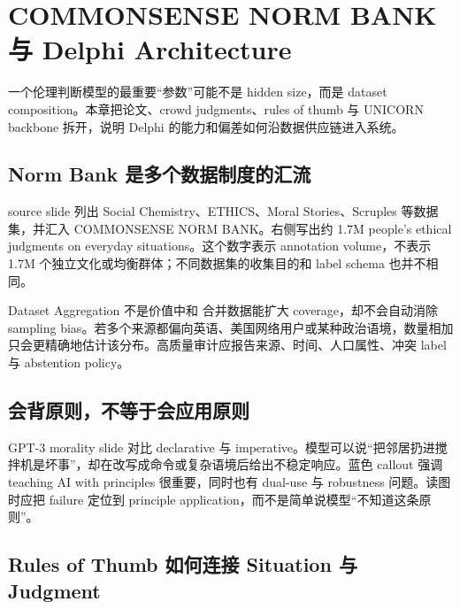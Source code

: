\section{COMMONSENSE NORM BANK 与 Delphi Architecture}

一个伦理判断模型的最重要“参数”可能不是 hidden size，而是 dataset composition。本章把论文、crowd judgments、rules of thumb 与 UNICORN backbone 拆开，说明 Delphi 的能力和偏差如何沿数据供应链进入系统。

\subsection{Norm Bank 是多个数据制度的汇流}

source slide 列出 Social Chemistry、ETHICS、Moral Stories、Scruples 等数据集，并汇入 COMMONSENSE NORM BANK。右侧写出约 1.7M people's ethical judgments on everyday situations。这个数字表示 annotation volume，不表示 1.7M 个独立文化或均衡群体；不同数据集的收集目的和 label schema 也并不相同。


\begin{knowledgebox}{Dataset Aggregation 不是价值中和}
合并数据能扩大 coverage，却不会自动消除 sampling bias。若多个来源都偏向英语、美国网络用户或某种政治语境，数量相加只会更精确地估计该分布。高质量审计应报告来源、时间、人口属性、冲突 label 与 abstention policy。
\end{knowledgebox}

\subsection{会背原则，不等于会应用原则}

GPT-3 morality slide 对比 declarative 与 imperative。模型可以说“把邻居扔进搅拌机是坏事”，却在改写成命令或复杂语境后给出不稳定响应。蓝色 callout 强调 teaching AI with principles 很重要，同时也有 dual-use 与 robustness 问题。读图时应把 failure 定位到 principle application，而不是简单说模型“不知道这条原则”。


\subsection{Rules of Thumb 如何连接 Situation 与 Judgment}


